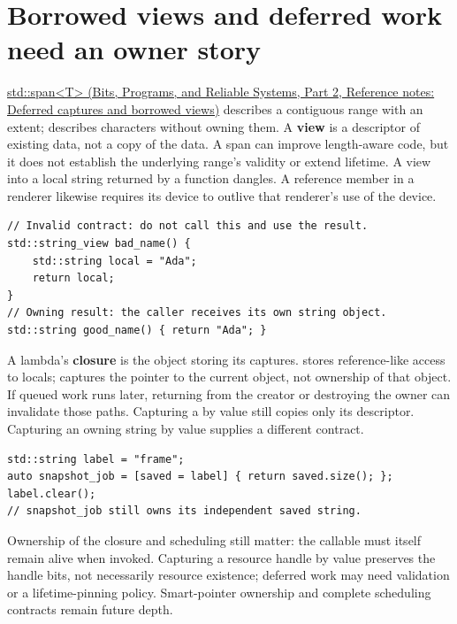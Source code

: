 \section{Borrowed views and deferred work need an owner story}\label{05-engine-i-ch003-borrowed-views-and-deferred-work-need-an-owner-story}

\hypertarget{05-engine-i-ch003-borrowed-views-and-deferred-work-need-an-owner-story}{}

\href{../01-Bits-Programs-and-Reliable-Systems-P02/main.pdf\#nameddest=appendix-aea529eb5175}{std::span\textless T\textgreater{} (Bits, Programs, and Reliable Systems, Part 2, Reference notes: Deferred captures and borrowed views)} describes a contiguous range with an extent;  describes characters without owning them. A \textbf{view} is a descriptor of existing data, not a copy of the data. A span can improve length-aware code, but it does not establish the underlying range's validity or extend lifetime. A view into a local string returned by a function dangles. A reference member in a renderer likewise requires its device to outlive that renderer's use of the device.

\begin{verbatim}
// Invalid contract: do not call this and use the result.
std::string_view bad_name() {
    std::string local = "Ada";
    return local;
}
// Owning result: the caller receives its own string object.
std::string good_name() { return "Ada"; }
\end{verbatim}

A lambda's \textbf{closure} is the object storing its captures. \BookInlineCode{{[}\&{]}} stores reference-like access to locals; \BookInlineCode{{[}this{]}} captures the pointer to the current object, not ownership of that object. If queued work runs later, returning from the creator or destroying the owner can invalidate those paths. Capturing a  by value still copies only its descriptor. Capturing an owning string by value supplies a different contract.

\begin{verbatim}
std::string label = "frame";
auto snapshot_job = [saved = label] { return saved.size(); };
label.clear();
// snapshot_job still owns its independent saved string.
\end{verbatim}

Ownership of the closure and scheduling still matter: the callable must itself remain alive when invoked. Capturing a resource handle by value preserves the handle bits, not necessarily resource existence; deferred work may need validation or a lifetime-pinning policy. Smart-pointer ownership and complete scheduling contracts remain future depth.

